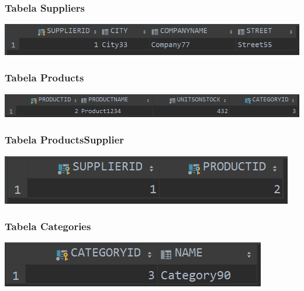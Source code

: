 \documentclass[a4paper, 11pt]{article}
\begin{document}
    \subsubsection{Tabela Suppliers}
    \begin{center}
        \includegraphics{images/point9/SelectSuppliers.png}
    \end{center}

    \subsubsection{Tabela Products}
    \begin{center}
        \includegraphics[scale=0.85]{images/point9/SelectProducts.png}
    \end{center}

    \subsubsection{Tabela ProductsSupplier}
    \begin{center}
        \includegraphics{images/point9/SelectProductsSupplier.png}
    \end{center}

    \subsubsection{Tabela Categories}
    \begin{center}
        \includegraphics[scale=0.85]{images/point9/SelectCategories.png}
    \end{center}

    \newpage
\end{document}
